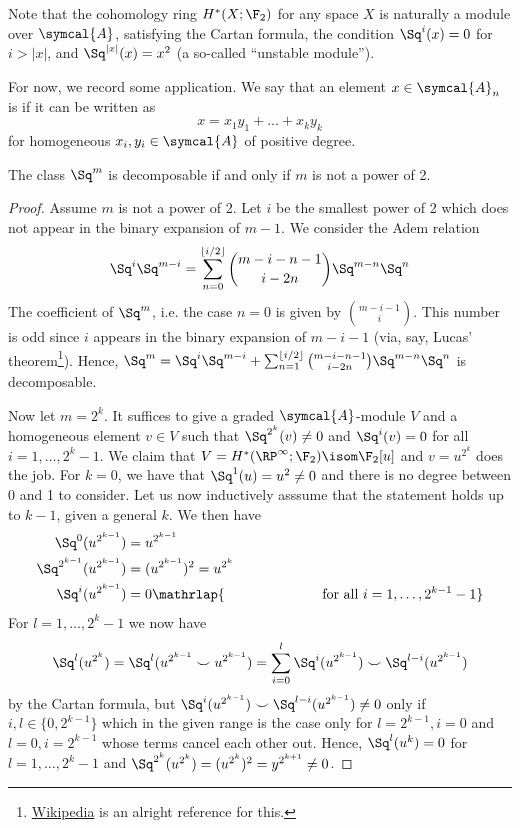 Note that the cohomology ring $H^*(X; \F_2)$ for any space $X$ is naturally a module over $\symcal{A}$, satisfying the Cartan formula, the condition $\Sq^i(x) = 0$ for $i > |x|$, and $\Sq^{|x|}(x) = x^2$ (a so-called \enquote{unstable module}).

For now, we record some application.
We say that an element $x \in \symcal{A}_n$ is  if it can be written as
\begin{equation*}
	x = x_1 y_1 + \ldots + x_k y_k
\end{equation*}
for homogeneous $x_i, y_i \in \symcal{A}$ of positive degree.
\begin{lemma}
	The class $\Sq^m$ is decomposable if and only if $m$ is not a power of 2.
\end{lemma}
\begin{proof}
	Assume $m$ is not a power of 2.
	Let $i$ be the smallest power of 2 which does not appear in the binary expansion of $m - 1$.
	We consider the Adem relation
	\begin{equation*}
		\Sq^i \Sq^{m - i} = \sum_{n = 0}^{\lfloor i / 2\rfloor} \binom{m - i - n - 1}{i - 2n} \Sq^{m - n} \Sq^n
	\end{equation*}
	The coefficient of $\Sq^m$, i.e. the case $n = 0$ is given by $\binom{m - i - 1}{i}$.
	This number is odd since $i$ appears in the binary expansion of $m - i - 1$ (via, say, Lucas' theorem\footnote{\href{https://en.wikipedia.org/wiki/Lucas\%27s_theorem}{Wikipedia} is an alright reference for this.}).
	Hence, $\Sq^m = \Sq^i \Sq^{m - i} + \sum_{n = 1}^{\lfloor i / 2\rfloor} \binom{m - i - n - 1}{i - 2n} \Sq^{m - n} \Sq^n$ is decomposable.

	Now let $m = 2^k$.
	It suffices to give a graded $\symcal{A}$-module $V$ and a homogeneous element $v \in V$ such that $\Sq^{2^k}(v) \neq 0$ and $\Sq^i(v) = 0$ for all $i = 1, \ldots, 2^k - 1$.
	We claim that $V = H^*(\RP^\infty; \F_2) \isom \F_2[u]$ and $v = u^{2^k}$ does the job.
	For $k = 0$, we have that $\Sq^1(u) = u^2 \neq 0$ and there is no degree between 0 and 1 to consider.
	Let us now inductively asssume that the statement holds up to $k - 1$, given a general $k$.
	We then have
	\begin{align*}
		\Sq^0(u^{2^{k - 1}}) &= u^{2^{k - 1}} \\
		\Sq^{2^{k - 1}}(u^{2^{k - 1}}) &= (u^{2^{k - 1}})^2 = u^{2^k} \qquad\qquad\\
		\Sq^i(u^{2^{k - 1}}) &= 0 \mathrlap{\qquad\qquad\qquad\quad\text{for all } i = 1, \ldots, 2^{k - 1} - 1}
	\end{align*}
	For $l = 1, \ldots, 2^k - 1$ we now have
	\begin{equation*}
		\Sq^l(u^{2^k}) = \Sq^l(u^{2^{k - 1}} \smile u^{2^{k - 1}}) = \sum_{i = 0}^l \Sq^i(u^{2^{k - 1}}) \smile \Sq^{l - i}(u^{2^{k - 1}})
	\end{equation*}
	by the Cartan formula, but $\Sq^i(u^{2^{k - 1}}) \smile \Sq^{l - i}(u^{2^{k - 1}}) \neq 0$ only if $i, l \in \{0, 2^{k - 1}\}$ which in the given range is the case only for $l = 2^{k - 1}, i = 0$ and $l = 0, i = 2^{k - 1}$ whose terms cancel each other out.
	Hence, $\Sq^l(u^k) = 0$ for $l = 1, \ldots, 2^k - 1$ and $\Sq^{2^k}(u^{2^k}) = (u^{2^k})^2 = y^{2^{k + 1}} \neq 0$.
\end{proof}
